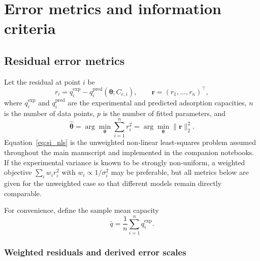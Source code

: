 \documentclass[journal=jacsat,manuscript=article]{achemso}
\begin{document}
	
\section{Error metrics and information criteria}
\label{sec:si_error_metrics}

\subsection{Residual error metrics}
\label{sec:si_residuals}

Let the residual at point $i$ be
\begin{equation}
	r_i = q_i^{\exp} - q_i^{\mathrm{pred}}(\boldsymbol{\theta}; C_{e,i}),
	\qquad
	\mathbf{r} = (r_1,\dots,r_n)^\top,
	\label{eq:si_residual_vector}
\end{equation}
where $q_i^{\exp}$ and $q_i^{\mathrm{pred}}$ are the experimental and
predicted adsorption capacities, $n$ is the number of data points, $p$
is the number of fitted parameters, and
\begin{equation}
	\hat{\boldsymbol{\theta}}
	=
	\arg\min_{\boldsymbol{\theta}}
	\sum_{i=1}^{n} r_i^2
	=
	\arg\min_{\boldsymbol{\theta}} \|\mathbf{r}\|_2^2.
	\label{eq:si_nls}
\end{equation}
Equation~\eqref{eq:si_nls} is the unweighted non-linear least-squares
problem assumed throughout the main manuscript and implemented in the
companion notebooks. If the experimental variance is known to be
strongly non-uniform, a weighted objective
$\sum_i w_i r_i^2$ with $w_i \propto 1/\sigma_i^2$ may be preferable,
but all metrics below are given for the unweighted case so that
different models remain directly comparable.

For convenience, define the sample mean capacity
\begin{equation}
	\bar{q} = \frac{1}{n}\sum_{i=1}^{n} q_i^{\exp}.
	\label{eq:si_qbar}
\end{equation}

\subsubsection{Weighted residuals and derived error scales}
\end{document}
